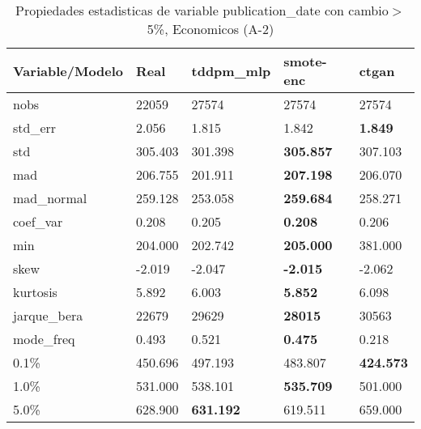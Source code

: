 \begin{table}[H]
\centering
\fontsize{8}{14}\selectfont
\caption{Propiedades estadisticas de variable publication\_date con cambio\ensuremath{>}5\%, Economicos (A-2)}
\label{table-stats-economicos-a-2-publication_date-short}
\begin{tabular}{|l|m{10em}|m{10em}|m{10em}|m{10em}|}
\hline
 \rowcolor[gray]{0.8}
Variable/Modelo & Real & tddpm\_mlp & smote-enc & ctgan \\
\hline nobs & 22059 & 27574 & 27574 & 27574 \\
\hline std\_err & 2.056 & \cellcolor[rgb]{0.9, 0.54, 0.52} 1.815 & 1.842 & \bfseries 1.849 \\
\hline std & 305.403 & \cellcolor[rgb]{0.9, 0.54, 0.52} 301.398 & \bfseries 305.857 & 307.103 \\
\hline mad & 206.755 & \cellcolor[rgb]{0.9, 0.54, 0.52} 201.911 & \bfseries 207.198 & 206.070 \\
\hline mad\_normal & 259.128 & \cellcolor[rgb]{0.9, 0.54, 0.52} 253.058 & \bfseries 259.684 & 258.271 \\
\hline coef\_var & 0.208 & \cellcolor[rgb]{0.9, 0.54, 0.52} 0.205 & \bfseries 0.208 & 0.206 \\
\hline min & 204.000 & 202.742 & \bfseries 205.000 & \cellcolor[rgb]{0.9, 0.54, 0.52} 381.000 \\
\hline skew & -2.019 & -2.047 & \bfseries -2.015 & \cellcolor[rgb]{0.9, 0.54, 0.52} -2.062 \\
\hline kurtosis & 5.892 & 6.003 & \bfseries 5.852 & \cellcolor[rgb]{0.9, 0.54, 0.52} 6.098 \\
\hline jarque\_bera & 22679 & 29629 & \bfseries 28015 & \cellcolor[rgb]{0.9, 0.54, 0.52} 30563 \\
\hline mode\_freq & 0.493 & 0.521 & \bfseries 0.475 & \cellcolor[rgb]{0.9, 0.54, 0.52} 0.218 \\
\hline 0.1\% & 450.696 & \cellcolor[rgb]{0.9, 0.54, 0.52} 497.193 & 483.807 & \bfseries 424.573 \\
\hline 1.0\% & 531.000 & 538.101 & \bfseries 535.709 & \cellcolor[rgb]{0.9, 0.54, 0.52} 501.000 \\
\hline 5.0\% & 628.900 & \bfseries 631.192 & 619.511 & \cellcolor[rgb]{0.9, 0.54, 0.52} 659.000 \\
\hline
\end{tabular}
\end{table}
